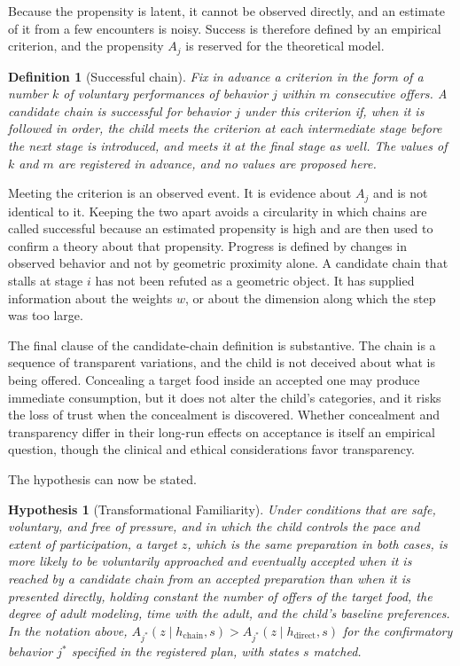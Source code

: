 \documentclass[11pt]{article}
\newtheorem{hypothesis}{Hypothesis}
\newtheorem{definition}{Definition}
\theoremstyle{remark}
\begin{document}
Because the propensity is latent, it cannot be observed directly, and an estimate of it from a few encounters is noisy. Success is therefore defined by an empirical criterion, and the propensity $A_j$ is reserved for the theoretical model.

\begin{definition}[Successful chain]
Fix in advance a criterion in the form of a number $k$ of voluntary performances of behavior $j$ within $m$ consecutive offers. A candidate chain is successful for behavior $j$ under this criterion if, when it is followed in order, the child meets the criterion at each intermediate stage before the next stage is introduced, and meets it at the final stage as well. The values of $k$ and $m$ are registered in advance, and no values are proposed here.
\end{definition}

Meeting the criterion is an observed event. It is evidence about $A_j$ and is not identical to it. Keeping the two apart avoids a circularity in which chains are called successful because an estimated propensity is high and are then used to confirm a theory about that propensity. Progress is defined by changes in observed behavior and not by geometric proximity alone. A candidate chain that stalls at stage $i$ has not been refuted as a geometric object. It has supplied information about the weights $w$, or about the dimension along which the step was too large.

The final clause of the candidate-chain definition is substantive. The chain is a sequence of transparent variations, and the child is not deceived about what is being offered. Concealing a target food inside an accepted one may produce immediate consumption, but it does not alter the child's categories, and it risks the loss of trust when the concealment is discovered. Whether concealment and transparency differ in their long-run effects on acceptance is itself an empirical question, though the clinical and ethical considerations favor transparency.

The hypothesis can now be stated.

\begin{hypothesis}[Transformational Familiarity]
Under conditions that are safe, voluntary, and free of pressure, and in which the child controls the pace and extent of participation, a target $z$, which is the same preparation in both cases, is more likely to be voluntarily approached and eventually accepted when it is reached by a candidate chain from an accepted preparation than when it is presented directly, holding constant the number of offers of the target food, the degree of adult modeling, time with the adult, and the child's baseline preferences. In the notation above, $A_{j^*}(z \mid h_{\text{chain}}, s) > A_{j^*}(z \mid h_{\text{direct}}, s)$ for the confirmatory behavior $j^*$ specified in the registered plan, with states $s$ matched.
\end{hypothesis}
\end{document}
